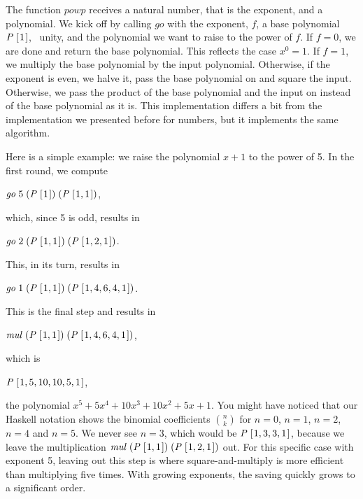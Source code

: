 \documentclass[tikz]{scrreprt}
\newcommand{\Conid}[1]{\mathit{#1}}
\newcommand{\Varid}[1]{\mathit{#1}}
\begin{document}
The function \ensuremath{\Varid{powp}} receives a natural number,
that is the exponent, and a polynomial.
We kick off by calling \ensuremath{\Varid{go}} with the exponent, $f$,
a base polynomial \ensuremath{\Conid{P}\;[\mskip1.5mu \mathrm{1}\mskip1.5mu]}, \ie\ unity, and the polynomial
we want to raise to the power of \ensuremath{\Varid{f}}.
If $f=0$, we are done and return the base polynomial.
This reflects the case $x^0=1$.
If $f=1$, we multiply the base polynomial by the input polynomial.
Otherwise, if the exponent is even,
we halve it, pass the base polynomial on and square the input.
Otherwise, we pass the product of the base polynomial and the input
on instead of the base polynomial as it is.
This implementation differs a bit from the implementation
we presented before for numbers, but it implements the same
algorithm.

Here is a simple example: we raise the polynomial
$x + 1$ to the power of 5. In the first round, we compute

\ensuremath{\Varid{go}\;\mathrm{5}\;(\Conid{P}\;[\mskip1.5mu \mathrm{1}\mskip1.5mu])\;(\Conid{P}\;[\mskip1.5mu \mathrm{1},\mathrm{1}\mskip1.5mu])},

which, since 5 is odd, results in 

\ensuremath{\Varid{go}\;\mathrm{2}\;(\Conid{P}\;[\mskip1.5mu \mathrm{1},\mathrm{1}\mskip1.5mu])\;(\Conid{P}\;[\mskip1.5mu \mathrm{1},\mathrm{2},\mathrm{1}\mskip1.5mu])}.

This, in its turn, results in

\ensuremath{\Varid{go}\;\mathrm{1}\;(\Conid{P}\;[\mskip1.5mu \mathrm{1},\mathrm{1}\mskip1.5mu])\;(\Conid{P}\;[\mskip1.5mu \mathrm{1},\mathrm{4},\mathrm{6},\mathrm{4},\mathrm{1}\mskip1.5mu])}.

This is the final step and results in 

\ensuremath{\Varid{mul}\;(\Conid{P}\;[\mskip1.5mu \mathrm{1},\mathrm{1}\mskip1.5mu])\;(\Conid{P}\;[\mskip1.5mu \mathrm{1},\mathrm{4},\mathrm{6},\mathrm{4},\mathrm{1}\mskip1.5mu])}, 

which is

\ensuremath{\Conid{P}\;[\mskip1.5mu \mathrm{1},\mathrm{5},\mathrm{10},\mathrm{10},\mathrm{5},\mathrm{1}\mskip1.5mu]},

the polynomial $x^5 + 5x^4 + 10x^3 + 10x^2 + 5x + 1$.
You might have noticed that our Haskell notation
shows the binomial coefficients $\binom{n}{k}$ for
$n=0$, $n=1$, $n=2$, $n=4$ and $n=5$.
We never see $n=3$, which would be 
\ensuremath{\Conid{P}\;[\mskip1.5mu \mathrm{1},\mathrm{3},\mathrm{3},\mathrm{1}\mskip1.5mu]}, because we leave the multiplication
\ensuremath{\Varid{mul}\;(\Conid{P}\;[\mskip1.5mu \mathrm{1},\mathrm{1}\mskip1.5mu])\;(\Conid{P}\;[\mskip1.5mu \mathrm{1},\mathrm{2},\mathrm{1}\mskip1.5mu])} out.
For this specific case with exponent 5,
leaving out this step is where square-and-multiply
is more efficient than multiplying five times.
With growing exponents, the saving quickly grows
to a significant order.
\end{document}

